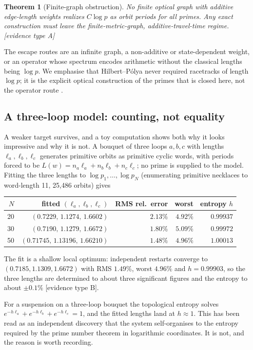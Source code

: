 \documentclass[11pt]{article}
\newtheorem{theorem}{Theorem}
\begin{document}
\begin{theorem}[Finite-graph obstruction]\label{thm:finitegraph}
No finite optical graph with additive edge-length weights realizes $C\log p$ as orbit
periods for all primes. Any exact construction must leave the finite-metric-graph,
additive-travel-time regime. [evidence type A]
\end{theorem}

The escape routes are an infinite graph, a non-additive or state-dependent weight, or an
operator whose spectrum encodes arithmetic without the classical lengths being
$\log p$. We emphasise that Hilbert--P\'olya never required racetracks of length
$\log p$; it is the explicit optical construction of the primes that is closed here,
not the operator route \cite{berrykeating1999}.

\subsection{A three-loop model: counting, not equality}

A weaker target survives, and a toy computation shows both why it looks impressive and
why it is not. A bouquet of three loops $a,b,c$ with lengths $\ell_a,\ell_b,\ell_c$
generates primitive orbits as primitive cyclic words, with periods forced to be
$L(w)=n_a\ell_a+n_b\ell_b+n_c\ell_c$; no prime is supplied to the model. Fitting the
three lengths to $\log p_1,\dots,\log p_N$ (enumerating primitive necklaces to
word-length 11, 25{,}486 orbits) gives
\begin{center}
\begin{tabular}{rrrrr}
\toprule
$N$ & fitted $(\ell_a,\ell_b,\ell_c)$ & RMS rel.\ error & worst & entropy $h$ \\
\midrule
20 & $(0.7229,\,1.1274,\,1.6602)$ & $2.13\%$ & $4.92\%$ & $0.99937$ \\
30 & $(0.7190,\,1.1279,\,1.6672)$ & $1.80\%$ & $5.09\%$ & $0.99972$ \\
50 & $(0.71745,\,1.13196,\,1.66210)$ & $1.48\%$ & $4.96\%$ & $1.00013$ \\
\bottomrule
\end{tabular}
\end{center}
The fit is a shallow local optimum: independent restarts converge to
$(0.7185,1.1309,1.6672)$ with RMS $1.49\%$, worst $4.96\%$ and $h=0.99903$, so the three
lengths are determined to about three significant figures and the entropy to about
$\pm0.1\%$ [evidence type B].

For a suspension on a three-loop bouquet the topological entropy solves
$e^{-h\ell_a}+e^{-h\ell_b}+e^{-h\ell_c}=1$, and the fitted lengths land at
$h\approx1$. This has been read as an independent discovery that the system
self-organises to the entropy required by the prime number theorem in logarithmic
coordinates. It is not, and the reason is worth recording.
\end{document}
